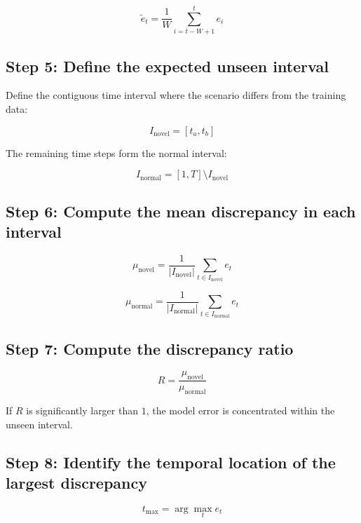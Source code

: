 \documentclass[a4paper]{article}
\begin{document}
            \[
                \tilde{e}_t =
                \frac{1}{W}
                \sum_{i=t-W+1}^{t} e_i
            \]
        
        \subsection{Step 5: Define the expected unseen interval}
            Define the contiguous time interval where the scenario differs from the training data:
            
            \[
                I_{\text{novel}} = [t_a, t_b]
            \]
            
            The remaining time steps form the normal interval:
            
            \[
                I_{\text{normal}} =
                [1,T] \setminus I_{\text{novel}}
            \]
        
        \subsection{Step 6: Compute the mean discrepancy in each interval}
            
            \[
                \mu_{\text{novel}} =
                \frac{1}{|I_{\text{novel}}|}
                \sum_{t \in I_{\text{novel}}} e_t
            \]
            
            \[
                \mu_{\text{normal}} =
                \frac{1}{|I_{\text{normal}}|}
                \sum_{t \in I_{\text{normal}}} e_t
            \]
        
        \subsection{Step 7: Compute the discrepancy ratio}
            
            \[
                R =
                \frac{\mu_{\text{novel}}}{\mu_{\text{normal}}}
            \]
            
            If \(R\) is significantly larger than \(1\), the model error is concentrated within the unseen interval.
        
        \subsection{Step 8: Identify the temporal location of the largest discrepancy}
            
            \[
                t_{\max} =
                \arg\max_{t} e_t
            \]
            
\end{document}
